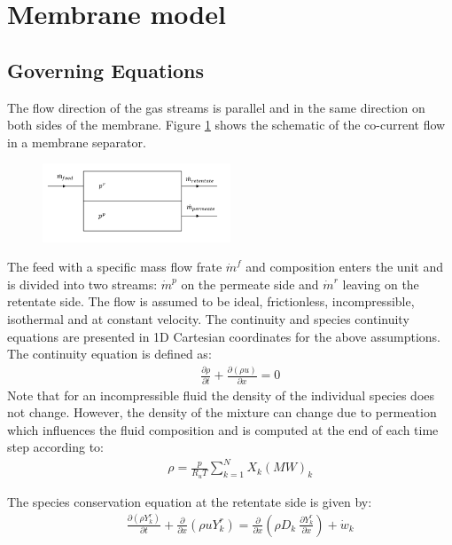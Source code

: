 \newpage
\section{Membrane model}\label{sec4}

\subsection{Governing Equations}\label{subsec1}
The flow direction of the gas streams is parallel and in the same direction on both sides of the membrane. Figure \ref{fig:fig5} shows the schematic of the co-current flow in a membrane separator. 
\begin{figure}[H]
	\centering
	\includegraphics[width= 0.5\textwidth]{Images/mathematical_model2.png}
	\label{fig:fig5}
\end{figure}
The feed with a specific mass flow frate $\dot{m}^f$ and composition enters the unit and is divided into two streams: $\dot{m}^p$ on the permeate side and $\dot{m}^r$ leaving on the retentate side. The flow is assumed to be ideal, frictionless, incompressible, isothermal and at constant velocity. The continuity and species continuity equations are presented in 1D Cartesian coordinates for the above assumptions. The continuity equation is defined as:
\begin{align}
	&& \frac{\partial \rho}{\partial t} + \frac{\partial (\rho u)}{\partial x} = 0
\end{align} 
Note that for an incompressible fluid the density of the individual species does not change. However, the density of the mixture can change due to permeation which influences the fluid composition and is computed at the end of each time step according to:
\begin{align}
	&&	\rho =  \frac{p}{R_uT} \sum_{k=1}^{N}X_k(MW)_k
\end{align}    

The species conservation equation at the retentate side is given by:
\begin{align}
&&\frac{\partial (\rho Y^r_k)}{\partial t} + \frac{\partial}{\partial x}  \left( \rho u Y^r_k\right)
= \frac{\partial}{\partial x}  \left( \rho D_k \ \frac{\partial Y^r_k }{\partial x}  \right) + \dot{w}_k
\label{eq:massbalance}
\end{align}

